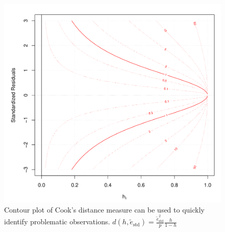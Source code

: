 \documentclass[11pt]{article}
\theoremstyle{definition}
\begin{document}
\begin{figure}[tbh]
	\centering
	\includegraphics[width=0.6\linewidth]{img/cook_distance_contour_plot}
	\caption{Contour plot of Cook's distance measure can be used to quickly identify problematic observations. $d(h, \tilde{e}_{\text{std}}) = \frac{\tilde{e}^2_{\text{std}}}{p}\frac{h}{1-h}$}
	\label{fig:cookdistancecontourplot}
\end{figure}
\end{document}

